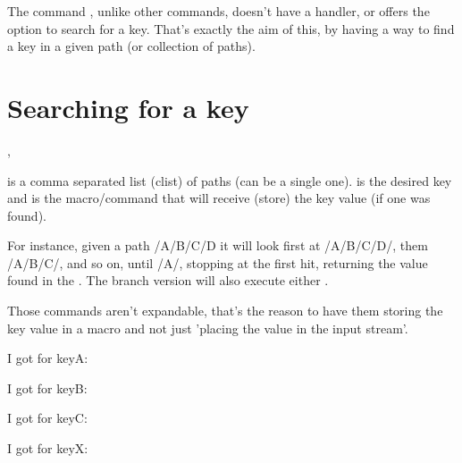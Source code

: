 \documentclass[10pt]{article}
\begin{document}
  
\begin{typesetabstract}

The command \tsobj{\pgfkeysvalueof}, unlike other \tsobj{\pgfkeys} commands, doesn't have a  handler, or offers the option to search for a key.
That's exactly the aim of this, by having a way to find a key in a given path (or collection of paths).
\end{typesetabstract}


\section{Searching for a key}
\begin{codedescribe}{\pgfkeysearchvalueof,\pgfkeysearchvalueofTF}
\begin{codesyntax}%
\end{codesyntax}
 is a comma separated list (clist) of paths (can be a single one).  is the desired key and  is the macro/command that will receive (store) the key value (if one was found).

For instance, given a path /A/B/C/D it will look first at /A/B/C/D/, them /A/B/C/, and so on, until /A/,
stopping at the first hit, returning the value found in the .
The branch version will also execute either .
  
\end{codedescribe}
\begin{tsremark}
  Those commands aren't expandable, that's the reason to have them storing the key value in a macro and not just 'placing the value in the input stream'.
\end{tsremark}

\begin{codestore}
 I got for keyA: \textbf{\VALkeyA} \par
 I got for keyB: \textbf{\VALkeyB} \par
 I got for keyC: \textbf{\VALkeyC} \par
 I got for keyX: \textbf{\VALkeyX} \par
\end{codestore}
\end{document}
